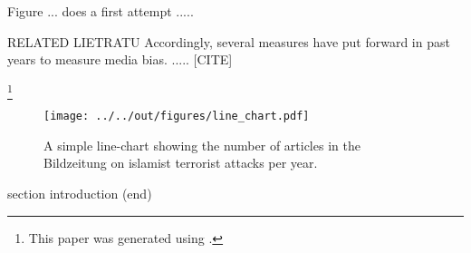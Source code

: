 \documentclass[11pt, a4paper, leqno]{article}
\begin{document}
Figure ... does a first attempt .....







RELATED LIETRATU
Accordingly, several measures have put forward in past years to measure media bias. ..... [CITE]








 \footnote{This paper was generated using \citet{GaudeckerEconProjectTemplates}.}
%

\begin{figure}
   \caption{A simple line-chart showing the number of articles in the Bildzeitung on islamist terrorist attacks per year.}
  
 \texttt{[image: ../../out/figures/line\_chart.pdf]}

\end{figure}


 section introduction (end)




{}





\end{document}
